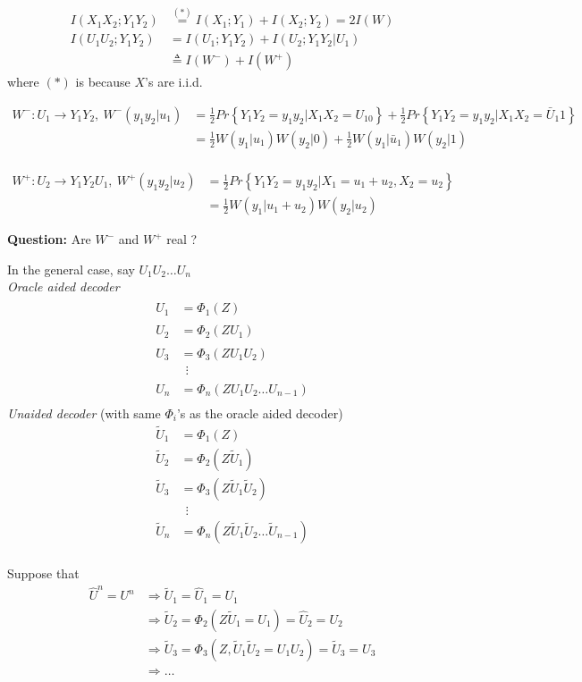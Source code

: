 \documentclass{article}
\theoremstyle{definition} %
\renewcommand{\Pr}[1]{Pr\left\{#1\right\}}
\begin{document}
\begin{align*}
  I(X_1X_2; Y_1Y_2) &\overset{(\ast)}= I(X_1; Y_1 ) + I(X_2;Y_2) = 2I(W)\\
  I(U_1U_2; Y_1Y_2) &= I(U_1; Y_1Y_2) + I(U_2; Y_1Y_2|U_1)\\
  &\triangleq I(W^-) + I(W^+)
\end{align*}
where $(\ast)$ is because $X$'s are i.i.d.

\begin{align*}
  W^- : U_1 \rightarrow Y_1Y_2,~ W^-(y_1y_2| u_1) &= \frac 1 2 \Pr{Y_1Y_2 = y_1y_2 | X_1X_2 = U_10} +
  \frac 1 2 \Pr{Y_1Y_2 = y_1y_2 | X_1X_2 = \bar U_1 1}\\
  &= \frac 1 2 W(y_1|u_1) W(y_2|0) + \frac 1 2 W(y_1|\bar u_1)W(y_2|1)\\
\end{align*}

\begin{align*}
  W^+ : U_2 \rightarrow Y_1Y_2U_1,~ W^+(y_1y_2| u_2) &= \frac 1 2 \Pr{Y_1Y_2 = y_1y_2 | X_1 = u_1 + u_2, X_2 = u_2} \\
  &= \frac 1 2 W(y_1|u_1 + u_2) W(y_2|u_2)
\end{align*}

\textbf{Question: } Are $W^-$ and $W^+$ real ?

In the general case, say $U_1U_2\dots U_n$\\
\emph{Oracle aided decoder}
\begin{align*}
  \hat U_1 &= \Phi_1(Z)\\
  \hat U_2 &= \Phi_2(ZU_1)\\
  \hat U_3 &= \Phi_3(ZU_1 U_2)\\
  &~~\vdots\\
  \hat U_n &= \Phi_n(ZU_1U_2\dots U_{n-1})\\
\end{align*}
\emph{Unaided decoder} (with same $\Phi_i$'s as the oracle aided decoder)
\begin{align*}
  \tilde U_1 &= \Phi_1(Z)\\
  \tilde U_2 &= \Phi_2(Z\tilde U_1)\\
  \tilde U_3 &= \Phi_3(Z\tilde U_1 \tilde U_2)\\
  &~~\vdots\\
  \tilde U_n &= \Phi_n(Z\tilde U_1\tilde U_2\dots \tilde U_{n-1})\\
\end{align*}

Suppose that
\begin{align*}
  \hat U ^ n = U^n &\Rightarrow \tilde U_1 = \hat U_1 = U_1\\
  &\Rightarrow \tilde U_2 = \Phi_2(Z\tilde U_1 = U_1) = \hat U_2 = U_2\\
  &\Rightarrow \tilde U _3 = \Phi_3(Z,\tilde U_1 \tilde U_2 = U_1 U_2) = \tilde U_3 =U_3\\
  &\Rightarrow \dots
\end{align*}
\end{document}
